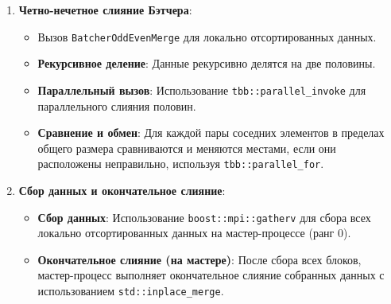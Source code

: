 \documentclass[12pt,a4paper]{extarticle}
\begin{document}
\begin{enumerate}
    \item \textbf{Четно-нечетное слияние Бэтчера}:
    \begin{itemize}
        \item Вызов \texttt{BatcherOddEvenMerge} для локально отсортированных данных.
        \item \textbf{Рекурсивное деление}: Данные рекурсивно делятся на две половины.
        \item \textbf{Параллельный вызов}: Использование \texttt{tbb::parallel\_invoke} для параллельного слияния половин.
        \item \textbf{Сравнение и обмен}: Для каждой пары соседних элементов в пределах общего размера сравниваются и меняются местами, если они расположены неправильно, используя \texttt{tbb::parallel\_for}.
    \end{itemize}
    
    \item \textbf{Сбор данных и окончательное слияние}:
    \begin{itemize}
        \item \textbf{Сбор данных}: Использование \texttt{boost::mpi::gatherv} для сбора всех локально отсортированных данных на мастер-процессе (ранг 0).
        \item \textbf{Окончательное слияние (на мастере)}: После сбора всех блоков, мастер-процесс выполняет окончательное слияние собранных данных с использованием \texttt{std::inplace\_merge}.
    \end{itemize}
    
\end{enumerate}
\end{document}
